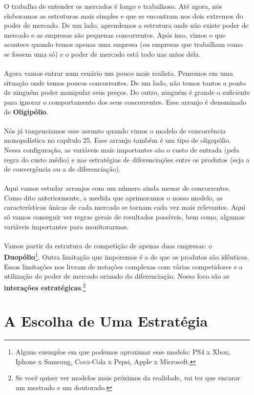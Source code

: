 \documentclass[a4paper,11pt,oneside]{book}
\theoremstyle{definition}
\theoremstyle{break}
\begin{document}
O trabalho de entender os mercados é longo e trabalhoso. Até agora, nós elaboramos as estruturas mais simples e que se encontram nos dois extremos do poder de mercado. De um lado, aprendemos a estrutura onde não existe poder de mercado e as empresas são pequenas concorrentes. Após isso, vimos o que acontece quando temos apenas uma empresa (ou empresas que trabalham como se fossem uma só) e o poder de mercado está todo nas mãos dela.
\\
\\
Agora vamos entrar num cenário um pouco mais realista. Pensemos em uma situação onde temos poucos concorrentes. De um lado, não temos tantos a ponto de ninguém poder manipular seus preços. Do outro, ninguém é grande o suficiente para ignorar o comportamento dos seus concorrentes. Esse arranjo é denominado de \textbf{Oligipólio}.
\\
\\
Nós já tangenciamos esse assunto quando vimos o modelo de concorrência monopolística no capítulo 25. Esse arranjo também é um tipo de oligopólio. Nessa configuração, as variáveis mais importantes são o custo de entrada (pela regra do custo médio) e nas estratégias de diferenciações entre os produtos (seja a de convergência ou a de diferenciação).
\\
\\
Aqui vamos estudar arranjos com um número ainda menor de concorrentes. Como dito anteriormente, a medida que aprimoramos o nosso modelo, as características únicas de cada mercado se tornam cada vez mais relevantes. Aqui só vamos conseguir ver regras gerais de resultados possíveis, bem como, algumas variáveis importantes para monitorarmos.
\\
\\
Vamos partir da estrutura de competição de apenas duas empresas: o \textbf{Duopólio}\footnote{Alguns exemplos em que podemos aproximar esse modelo: PS4 x Xbox, Iphone x Samsung, Coca-Cola x Pepsi, Apple x Microsoft.}. Outra limitação que imporemos é a de que os produtos são idênticos. Essas limitações nos livram de notações complexas com várias competidores e a utilização do poder de mercado oriundo da diferenciação. Nosso foco são as \textbf{interações estratégicas}.\footnote{Se você quiser ver modelos mais próximos da realidade, vai ter que encarar um mestrado e um doutorado.}

\section{A Escolha de Uma Estratégia}
\end{document}
